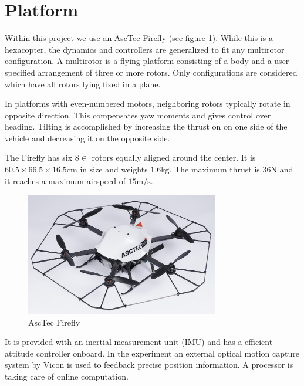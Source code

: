 \section{Platform}
Within this project we use an AscTec Firefly (see figure \ref{pics:firefly}). While this is a hexacopter, the dynamics and controllers are generalized to fit any multirotor configuration. A multirotor is a flying platform consisting of a body and a user specified arrangement of three or more rotors. Only configurations are considered which have all rotors lying fixed in a plane.

In platforms with even-numbered motors, neighboring rotors typically rotate in opposite direction. This compensates yaw moments and gives control over heading. Tilting is accomplished by increasing the thrust on on one side of the vehicle and decreasing it on the opposite side.

The Firefly has six $8 \si{\in}$ rotors equally aligned around the center. It is $60.5 \times 66.5 \times 16.5 \si{\cm}$ in size and weights $1.6 \si{\kg}$. The maximum thrust is $36 \si{\N}$ and it reaches a maximum airspeed of $15 \si{\metre\per\second}$.

\begin{figure}
   \centering
   \includegraphics[width=0.75\textwidth]{images/firefly.jpg}
   \caption{AscTec Firefly \cite{www:asctec}}
   \label{pics:firefly}
\end{figure}

It is provided with an inertial measurement unit (IMU) and has a efficient attitude controller onboard. In the experiment an external optical motion capture system by Vicon is used to feedback precise position information. A processor is taking care of online computation.

